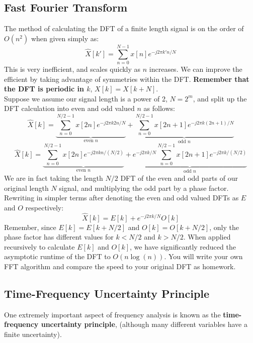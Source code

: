 \documentclass[a4paper]{article}
\numberwithin{equation}{section}
\begin{document}
\subsection{Fast Fourier Transform}
The method of calculating the DFT of a finite length signal is on the order of $O(n^2)$ when given simply as: 
\begin{equation}
\hat{X}[k']=\sum_{n=0}^{N-1}x[n]e^{-j2\pi k' n/N}
\end{equation}
This is very inefficient, and scales quickly as $n$ increases. We can improve the efficient by taking advantage of symmetries within the DFT. \textbf{Remember that the DFT is periodic in $k$}, $X[k]=X[k+N]$. \\

Suppose we assume our signal length is a power of 2, $N=2^m$, and split up the DFT calculation into even and odd valued $n$ as follows:
\begin{equation}
\hat{X}[k]=\underbrace{\sum_{n=0}^{N/2-1}x[2n]e^{-j2\pi k 2n/N}}_{\text{even }n}+\underbrace{\sum_{n=0}^{N/2-1}x[2n+1]e^{-j2\pi k (2n+1)/N}}_{\text{odd } n}
\end{equation}
\begin{equation}
\hat{X}[k]=\underbrace{\sum_{n=0}^{N/2-1}x[2n]e^{-j2\pi k n/(N/2)}}_{\text{even }n}+\underbrace{e^{-j2\pi k/N}\sum_{n=0}^{N/2-1}x[2n+1]e^{-j2\pi k /(N/2)}}_{\text{odd } n}
\end{equation}
We are in fact taking the length $N/2$ DFT of the even and odd parts of our original length $N$ signal, and multiplying the odd part by a phase factor. Rewriting in simpler terms after denoting the even and odd valued DFTs as $E$ and $O$ respectively:
\begin{equation}
\hat{X}[k] = E[k] + e^{-j2\pi k/N}O[k]
\end{equation}
Remember, since $E[k]=E[k+N/2]$ and $O[k]=O[k+N/2]$, only the phase factor has different values for $k<N/2$ and $k>N/2$. When applied recursively to calculate $E[k]$ and $O[k]$, we have significantly reduced the asymptotic runtime of the DFT to $O(n \log(n))$. You will write your own FFT algorithm and compare the speed to your original DFT as homework.

\subsection{Time-Frequency Uncertainty Principle}
One extremely important aspect of frequency analysis is known as the \textbf{time-frequency uncertainty principle}, (although many different variables have a finite uncertainty).\\
\end{document}
